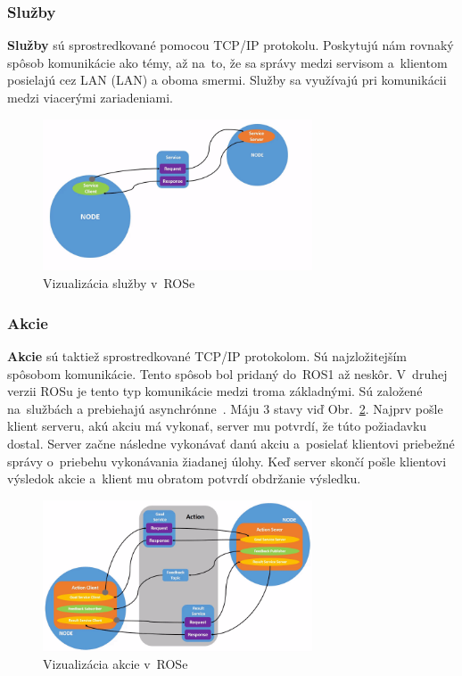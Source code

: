 \newpage
\subsubsection{Služby}

\textbf {Služby} sú sprostredkované pomocou TCP/IP protokolu. Poskytujú nám rovnaký spôsob komunikácie ako témy, až na~to, že sa správy
medzi servisom a~klientom posielajú cez LAN (\acrlong{LAN}) a oboma smermi. Služby sa využívajú pri komunikácii medzi viacerými zariadeniami.

\begin{figure}[h]
	\centering
	\includegraphics[width=8cm]{img/serviceExplanation.png}
	\caption{Vizualizácia služby v~ROSe~\cite{RosDoc}}
	\label{fig:service}
\end{figure}

\subsubsection{Akcie}

\label{s_action}
\textbf {Akcie} sú taktiež sprostredkované TCP/IP protokolom. Sú najzložitejším spôsobom komunikácie. Tento spôsob bol pridaný do~ROS1 až neskôr.
V~druhej verzii ROSu je tento typ komunikácie medzi troma základnými. Sú založené na~službách a prebiehajú asynchrónne~\cite{ROS2book}.
Máju 3 stavy viď Obr.~\ref{fig:action}. Najprv pošle klient serveru, akú akciu má vykonať, server mu potvrdí, že túto požiadavku dostal. Server
začne následne vykonávať danú akciu a~posielať klientovi priebežné správy o~priebehu vykonávania žiadanej úlohy. Keď server skončí pošle klientovi
výsledok akcie a~klient mu obratom potvrdí obdržanie výsledku.

\begin{figure}[h]
	\centering
	\includegraphics[width=8cm]{img/actionExplanation.png}
	\caption{Vizualizácia akcie v~ROSe~\cite{RosDoc}}
	\label{fig:action}
\end{figure}


